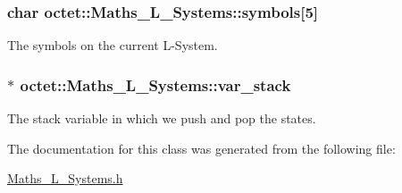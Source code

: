 \hypertarget{classoctet_1_1_maths___l___systems_acd98087b379a1b860b1631a6224470e9}{
\subsubsection[{symbols}]{\setlength{\rightskip}{0pt plus 5cm}char octet\+::\+Maths\+\_\+\+L\+\_\+\+Systems\+::symbols\mbox{[}5\mbox{]}\hspace{0.3cm}{\ttfamily [private]}}}\label{classoctet_1_1_maths___l___systems_acd98087b379a1b860b1631a6224470e9}


The symbols on the current L-\/\+System. 

\hypertarget{classoctet_1_1_maths___l___systems_a565e71fcec0d1a4d0cca48e99c3b6aca}{
\subsubsection[{var\+\_\+stack}]{ $\ast$ octet\+::\+Maths\+\_\+\+L\+\_\+\+Systems\+::var\+\_\+stack\hspace{0.3cm}{\ttfamily [private]}}}\label{classoctet_1_1_maths___l___systems_a565e71fcec0d1a4d0cca48e99c3b6aca}


The stack variable in which we push and pop the states. 



The documentation for this class was generated from the following file\+:\begin{DoxyCompactItemize}
\item 
\hyperlink{_maths___l___systems_8h}{Maths\+\_\+\+L\+\_\+\+Systems.\+h}\end{DoxyCompactItemize}
